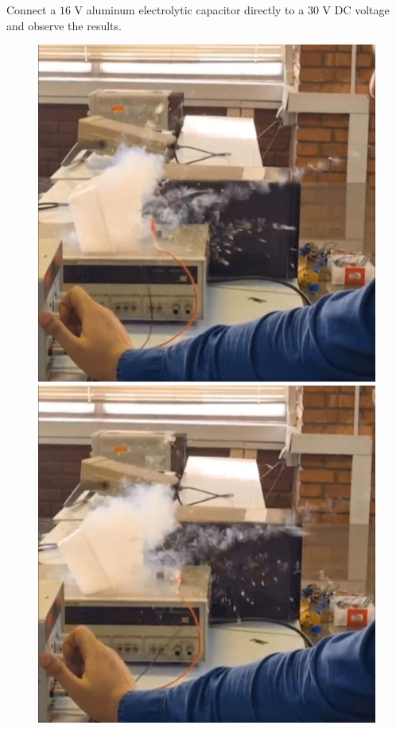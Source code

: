 \documentclass[11pt]{article}
\begin{document}
\begin{question}
\begin{subquestion}{Connect a $16$ V aluminum electrolytic capacitor directly to a $30$ V DC voltage and observe the results.}
{\begin{figure}[H]
                \includegraphics[scale=0.08,angle=0]{Fig/6.jpeg}
                \includegraphics[scale=0.08,angle=0]{Fig/7.jpeg}
            \end{figure}

}
\end{subquestion}
\end{question}
\end{document}
